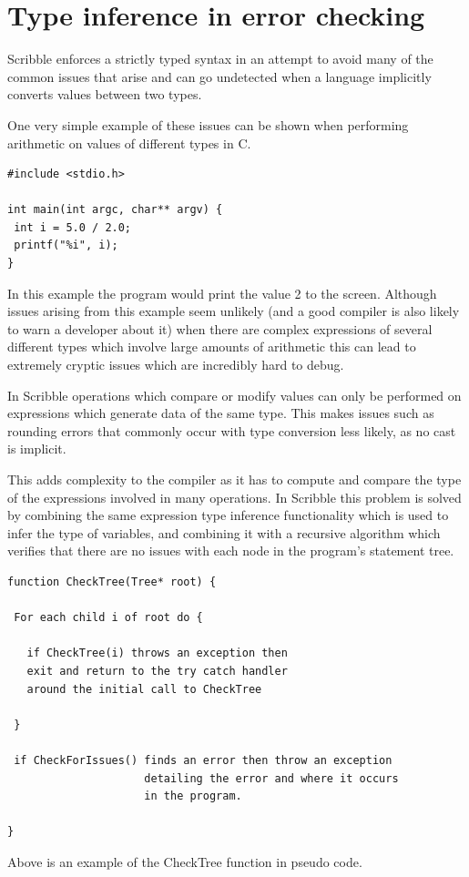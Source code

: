 \documentclass[]{final_report}
\begin{document}
\section{Type inference in error checking}

Scribble enforces a strictly typed syntax in an attempt to avoid many of the common issues that arise and can go undetected when a language implicitly converts values between two types.

One very simple example of these issues can be shown when performing arithmetic on values of different types in C.

\begin{verbatim}
#include <stdio.h>

int main(int argc, char** argv) {
 int i = 5.0 / 2.0;
 printf("%i", i);
}
\end{verbatim}

In this example the program would print the value 2 to the screen. Although issues arising from this example seem unlikely (and a good compiler is also likely to warn a developer about it) when there are complex expressions of several different types which involve large amounts of arithmetic this can lead to extremely cryptic issues which are incredibly hard to debug.

In Scribble operations which compare or modify values can only be performed on expressions which generate data of the same type. This makes issues such as rounding errors that commonly occur with type conversion less likely, as no cast is implicit. 

This adds complexity to the compiler as it has to compute and compare the type of the expressions involved in many operations. In Scribble this problem is solved by combining the same expression type inference functionality which is used to infer the type of variables, and combining it with a recursive algorithm which verifies that there are no issues with each node in the program's statement tree.

\begin{verbatim}
function CheckTree(Tree* root) {
 
 For each child i of root do {

   if CheckTree(i) throws an exception then 
   exit and return to the try catch handler 
   around the initial call to CheckTree
   
 }
 
 if CheckForIssues() finds an error then throw an exception 
 					 detailing the error and where it occurs 
 					 in the program.

}
\end{verbatim}
Above is an example of the CheckTree function in pseudo code.
\end{document}
